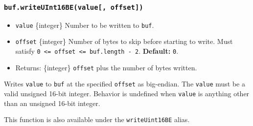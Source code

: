 \subsubsection{\texorpdfstring{\texttt{buf.writeUInt16BE(value{[},\ offset{]})}}{buf.writeUInt16BE(value{[}, offset{]})}}\label{buf.writeuint16bevalue-offset}

\begin{itemize}
\tightlist
\item
  \texttt{value} \{integer\} Number to be written to \texttt{buf}.
\item
  \texttt{offset} \{integer\} Number of bytes to skip before starting to
  write. Must satisfy
  \texttt{0\ \textless{}=\ offset\ \textless{}=\ buf.length\ -\ 2}.
  \textbf{Default:} \texttt{0}.
\item
  Returns: \{integer\} \texttt{offset} plus the number of bytes written.
\end{itemize}

Writes \texttt{value} to \texttt{buf} at the specified \texttt{offset}
as big-endian. The \texttt{value} must be a valid unsigned 16-bit
integer. Behavior is undefined when \texttt{value} is anything other
than an unsigned 16-bit integer.

This function is also available under the \texttt{writeUint16BE} alias.

\begin{Shaded}
\begin{Highlighting}[]
\NormalTok{ \{ }\NormalTok{ \} } \OperatorTok{;}

\OperatorTok{=} \NormalTok{(}\NormalTok{)}\OperatorTok{;}

\NormalTok{(}\OperatorTok{,} \NormalTok{)}\OperatorTok{;}
\NormalTok{(}\OperatorTok{,} \NormalTok{)}\OperatorTok{;}

\OperatorTok{;}
\end{Highlighting}
\end{Shaded}

